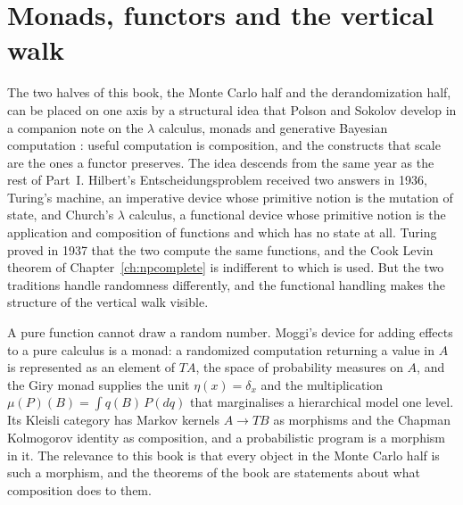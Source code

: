 \section{Monads, functors and the vertical walk}
\label{sec:monads}

The two halves of this book, the Monte Carlo half and the derandomization half, can be placed on one axis by a structural idea that Polson and Sokolov develop in a companion note on the $\lambda$ calculus, monads and generative Bayesian computation \cite{PolsonSokolovMonads}: useful computation is composition, and the constructs that scale are the ones a functor preserves. The idea descends from the same year as the rest of Part~I. Hilbert's Entscheidungsproblem received two answers in 1936, Turing's machine, an imperative device whose primitive notion is the mutation of state, and Church's $\lambda$ calculus, a functional device whose primitive notion is the application and composition of functions and which has no state at all. Turing proved in 1937 that the two compute the same functions, and the Cook Levin theorem of Chapter~\ref{ch:npcomplete} is indifferent to which is used. But the two traditions handle randomness differently, and the functional handling makes the structure of the vertical walk visible.

A pure function cannot draw a random number. Moggi's \cite{Moggi} device for adding effects to a pure calculus is a monad: a randomized computation returning a value in $A$ is represented as an element of $T A$, the space of probability measures on $A$, and the Giry monad \cite{Giry} supplies the unit $\eta(x) = \delta_x$ and the multiplication $\mu(P)(B) = \int q(B) \, P(dq)$ that marginalises a hierarchical model one level. Its Kleisli category has Markov kernels $A \to T B$ as morphisms and the Chapman Kolmogorov identity as composition, and a probabilistic program is a morphism in it. The relevance to this book is that every object in the Monte Carlo half is such a morphism, and the theorems of the book are statements about what composition does to them.

